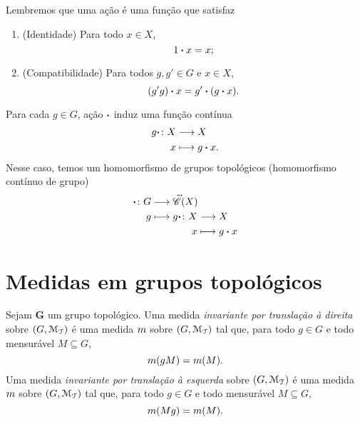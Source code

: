 Lembremos que uma ação é uma função que satisfaz
	\begin{enumerate}
	\item (Identidade) Para todo $x \in X$,
		\begin{equation*}
		1\bm{\cdot} x = x;
		\end{equation*}
	\item (Compatibilidade) Para todos $g,g' \in G$ e $x \in X$,
		\begin{equation*}
		(g'g)\bm{\cdot} x = g'\bm{\cdot}(g\bm{\cdot} x).
		\end{equation*}
	\end{enumerate}

Para cada $g \in G$, ação $\bm{\cdot}$ induz uma função contínua
	\begin{align*}
	{g\bm{\cdot}}\colon {X} &\longrightarrow {X} \\{x} &\longmapsto g\bm{\cdot} x.
	\end{align*}
Nesse caso, temos um homomorfismo de grupos topológicos (homomorfismo contínuo de grupo)
	\begin{align*}
	\func{\pt}{G}{\Iso{\Cont}(X)}{g}{
		\begin{aligned}[t]
		\func{g\pt}{X}{X}{x}{g\pt x}
		\end{aligned}
	}
	\end{align*}

\begin{comment}

\begin{proof}
\begin{enumerate}
	\item [($\Rightarrow$)] Suponhamos que a ação $\fun{\varphi}{G \times X}{X}$ seja contínua e mostremos que a ação $\fun{\phi}{G}{\Iso{\Cont}(X)}$ é contínua. Para isso,
 
	\item [($\Leftarrow$)]
\end{enumerate}
\end{proof}

\end{comment}











\section{Medidas em grupos topológicos}

\begin{definition}
Sejam $\bm G$ um grupo topológico. Uma medida \emph{invariante por translação à direita} sobre $(G,\mathcal{M}_{\mathcal{T}})$ é uma medida $m$ sobre $(G,\mathcal{M}_{\mathcal{T}})$ tal que, para todo $g \in G$ e todo mensurável $M \subseteq G$,
	\begin{equation*}
	m(gM) = m(M).
	\end{equation*}
Uma medida \emph{invariante por translação à esquerda} sobre $(G,\mathcal{M}_{\mathcal{T}})$ é uma medida $m$ sobre $(G,\mathcal{M}_{\mathcal{T}})$ tal que, para todo $g \in G$ e todo mensurável $M \subseteq G$,
	\begin{equation*}
	m(Mg) = m(M).
	\end{equation*}
\end{definition}

